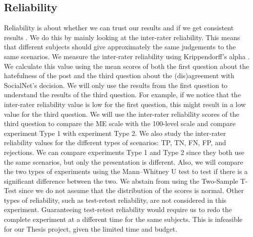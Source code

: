 \documentclass[a4paper]{article}
\begin{document}
\subsection{Reliability}
Reliability is about whether we can trust our results and if we get consistent results \cite{fitzner2007reliability}. We do this by mainly looking at the inter-rater reliability. This means that different subjects should give approximately the same judgements to the same scenarios. We measure the inter-rater reliability using Krippendorff's alpha \cite{maddalena2017crowdsourcing, krippendorff2004reliability}. We calculate this value using the mean scores of both the first question about the hatefulness of the post and the third question about the (dis)agreement with SocialNet’s decision. We will only use the results from the first question to understand the results of the third question. For example, if we notice that the inter-rater reliability value is low for the first question, this might result in a low value for the third question. We will use the inter-rater reliability scores of the third question to compare the ME scale with the 100-level scale and compare experiment Type 1 with experiment Type 2. We also study the inter-rater reliability values for the different types of scenarios: TP, TN, FN, FP, and rejections. We can compare experiments Type 1 and Type 2 since they both use the same scenarios, but only the presentation is different. Also, we will compare the two types of experiments using the Mann–Whitney U test to test if there is a significant difference between the two. We abstain from using the Two-Sample T-Test since we do not assume that the distribution of the scores is normal. Other types of reliability, such as test-retest reliability, are not considered in this experiment. Guaranteeing test-retest reliability would require us to redo the complete experiment at a different time for the same subjects. This is infeasible for our Thesis project, given the limited time and budget.
\end{document}

